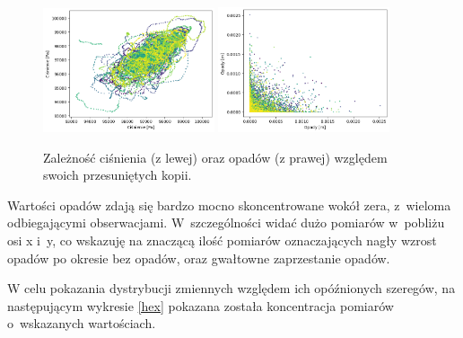 \begin{figure}[H]
    \centering
    \includegraphics[width=0.45\textwidth]{images/pressure_scatter.png}
    \includegraphics[width=0.45\textwidth]{images/precipitation_scatter.png}
    \caption[Korelacja ciśnienia]{Zależność ciśnienia (z lewej) oraz opadów (z prawej) względem 
    swoich przesuniętych kopii.}
    \label{pressure-precipitation}
\end{figure}

Wartości opadów zdają się bardzo mocno skoncentrowane wokół zera, z~wieloma 
odbiegającymi obserwacjami. W~szczególności widać dużo pomiarów w~pobliżu 
osi x i~y, co wskazuję na znaczącą ilość pomiarów oznaczających nagły wzrost opadów
po okresie bez opadów, oraz gwałtowne zaprzestanie opadów.

W celu pokazania dystrybucji zmiennych względem ich opóźnionych szeregów, na następującym 
wykresie \ref{hex} pokazana została koncentracja pomiarów o~wskazanych wartościach.

